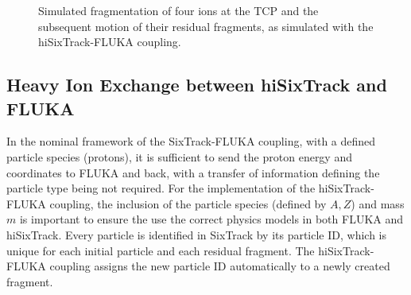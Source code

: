\begin{figure}[b]
  \centering
  \caption{Simulated fragmentation of four \lead ions at the TCP and the subsequent motion of their residual fragments, as simulated with the hiSixTrack-FLUKA coupling.}  
  \label{pic:16021803}
  \end{figure}



\subsection{Heavy Ion Exchange between hiSixTrack and FLUKA}



In the nominal framework of the SixTrack-FLUKA coupling, with a defined particle species (protons), it is sufficient to send the proton energy and coordinates to FLUKA and back, with a transfer of information defining the particle type being not required. For the implementation of the hiSixTrack-FLUKA coupling, the inclusion of the particle species (defined by $A,Z$) and mass $m$ is important to ensure the use the correct physics models in both FLUKA and hiSixTrack. Every particle is identified in SixTrack by its particle ID, which is unique for each initial particle and each residual fragment. The hiSixTrack-FLUKA coupling assigns the new particle ID automatically to a newly created fragment. 


